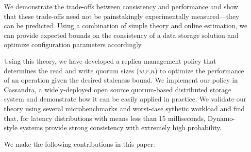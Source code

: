 \documentclass{vldb}
\begin{document}
We demonstrate the
trade-offs between consistency and performance and show that these
trade-offs need not be painstakingly experimentally measured---they
can be predicted.  Using a combination of simple theory and online
estimation, we can provide expected bounds on the consistency of a
data storage solution and optimize configuration parameters
accordingly.

Using this theory, we have developed a replica management policy that
determines the read and write quorum sizes ($w$,$r$,$n$) to optimize
the performance of an operation given the desired staleness bound. We
implement our policy in Cassandra, a widely-deployed open source
quorum-based distributed storage system and demonstrate how it can be
easily applied in practice. We validate our theory using several
microbenchmarks and worst-case sythetic workload and find that, for
latency distributions with means less than 15 milliseconds,
Dynamo-style systems provide strong consistency with extremely high
probability.

We make the following contributions in this paper:
\end{document}
